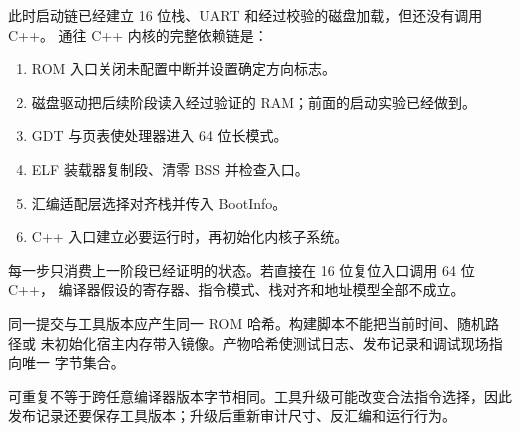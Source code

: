 此时启动链已经建立 16 位栈、UART 和经过校验的磁盘加载，但还没有调用 C++。
通往 C++ 内核的完整依赖链是：

\begin{enumerate}[label=\arabic*.]
  \item ROM 入口关闭未配置中断并设置确定方向标志。
  \item 磁盘驱动把后续阶段读入经过验证的 RAM；前面的启动实验已经做到。
  \item GDT 与页表使处理器进入 64 位长模式。
  \item ELF 装载器复制段、清零 BSS 并检查入口。
  \item 汇编适配层选择对齐栈并传入 BootInfo。
  \item C++ 入口建立必要运行时，再初始化内核子系统。
\end{enumerate}

每一步只消费上一阶段已经证明的状态。若直接在 16 位复位入口调用 64 位 C++，
编译器假设的寄存器、指令模式、栈对齐和地址模型全部不成立。

同一提交与工具版本应产生同一 ROM 哈希。构建脚本不能把当前时间、随机路径或
未初始化宿主内存带入镜像。产物哈希使测试日志、发布记录和调试现场指向唯一
字节集合。

可重复不等于跨任意编译器版本字节相同。工具升级可能改变合法指令选择，因此
发布记录还要保存工具版本；升级后重新审计尺寸、反汇编和运行行为。
